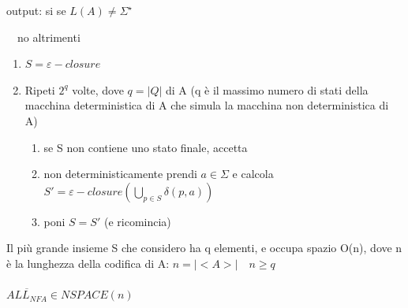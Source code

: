 output: si se $L(A) \neq \Sigma^{\star}$

\quad \quad \quad \ \ no altrimenti
\begin{enumerate}
	\item $S = \varepsilon-closure$
	\item Ripeti $2^q$ volte, dove $q=|Q|$ di A (q è il massimo numero di stati della macchina deterministica di A che simula la macchina non deterministica di A)
	\begin{enumerate}[label*=\arabic*.]
		\item se S non contiene uno stato finale, accetta
		\item non deterministicamente prendi $a \in \Sigma$ e calcola $S' = \varepsilon-closure ( \bigcup_{p \in S} \delta (p,a) )$
		\item poni $S = S'$ (e ricomincia)
	\end{enumerate}
\end{enumerate}
Il più grande insieme S che considero ha q elementi, e occupa spazio O(n), dove n è la lunghezza della codifica di A: $n=|<A>| \quad n \geq q$
\\\\
$\overline{ALL_{NFA}} \in NSPACE(n)$ \newpage